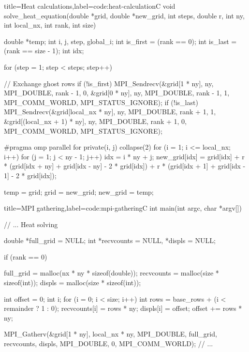 \documentclass[../main.tex]{subfiles}
\begin{document}
\begin{code}{title=Heat calculations,label=code:heat-calculation}{C}
void solve_heat_equation(double *grid, double *new_grid, int steps, double r, int ny, int local_nx, int rank, int size) 
{
    double *temp;
    int i, j, step, global_i;
    int is_first = (rank == 0);
    int is_last = (rank == size - 1);
    int idx;

    for (step = 1; step < steps; step++)
    {
        // Exchange ghost rows
        if (!is_first)
        {
            MPI_Sendrecv(&grid[1 * ny], ny, MPI_DOUBLE, rank - 1, 0,
                        &grid[0 * ny], ny, MPI_DOUBLE, rank - 1, 1,
                        MPI_COMM_WORLD, MPI_STATUS_IGNORE);
        }
        if (!is_last)
        {
            MPI_Sendrecv(&grid[local_nx * ny], ny, MPI_DOUBLE, rank + 1, 1,
                        &grid[(local_nx + 1) * ny], ny, MPI_DOUBLE, rank + 1, 0,
                        MPI_COMM_WORLD, MPI_STATUS_IGNORE);
        }

#pragma omp parallel for private(i, j) collapse(2)
        for (i = 1; i <= local_nx; i++)
        {
            for (j = 1; j < ny - 1; j++)
            {
                idx = i * ny + j;
                new_grid[idx] = grid[idx]
                                + r * (grid[idx + ny] + grid[idx - ny] - 2 * grid[idx])
                                + r * (grid[idx + 1] + grid[idx - 1] - 2 * grid[idx]);
            }
        }

        temp = grid;
        grid = new_grid;
        new_grid = temp;
    }
}
\end{code}

\begin{code}{title=MPI gathering,label=code:mpi-gathering}{C}
    int main(int argc, char *argv[]) {
        // ... Heat solving

        double *full_grid = NULL;
        int *recvcounts = NULL, *displs = NULL;
        
        if (rank == 0)
        {
            full_grid = malloc(nx * ny * sizeof(double));
            recvcounts = malloc(size * sizeof(int));
            displs = malloc(size * sizeof(int));

            int offset = 0;
            int i;
            for (i = 0; i < size; i++)
            {
                int rows = base_rows + (i < remainder ? 1 : 0);
                recvcounts[i] = rows * ny;
                displs[i] = offset;
                offset += rows * ny;
            }
        }

        MPI_Gatherv(&grid[1 * ny], local_nx * ny, MPI_DOUBLE,
                    full_grid, recvcounts, displs, MPI_DOUBLE,
                    0, MPI_COMM_WORLD);
        // ...
    } 
\end{code}
\end{document}
